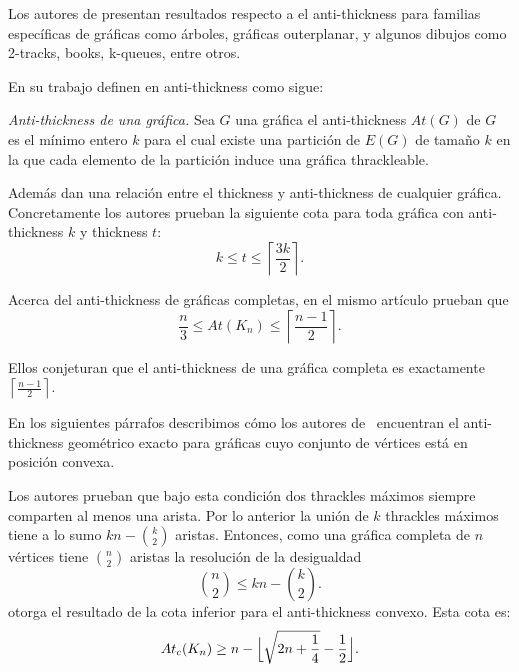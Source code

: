 %
Los autores de \cite{Dujmovic2017} presentan resultados respecto a el
anti-thickness para familias específicas de gráficas como árboles, gráficas
outerplanar, y algunos dibujos como 2-tracks, books, k-queues, entre otros.

En su trabajo definen en anti-thickness como sigue:
\begin{definition}{\emph{Anti-thickness de una gráfica.}}
Sea $G$ una gráfica el anti-thickness $At(G)$ de $G$ es el mínimo entero $k$
para el cual existe una partición de $E(G)$ de tamaño $k$
en la que cada elemento de la partición induce una gráfica thrackleable.
\end{definition}

Además dan una relación entre el thickness y anti-thickness de cualquier
gráfica. Concretamente los autores prueban la siguiente cota para toda gráfica
con anti-thickness $k$ y thickness $t$:
\[ k \leq t \leq \left\lceil \frac{3k}{2}\right\rceil .\]

Acerca del anti-thickness de gráficas completas, en el mismo artículo
prueban que \[ \frac{n}{3} \leq  At(K_n) \leq \left\lceil \frac{n-1}{2} \right\rceil . \]

Ellos conjeturan que el anti-thickness de una gráfica completa es
exactamente $\left\lceil \frac{n-1}{2} \right\rceil$.

En los siguientes párrafos describimos cómo los autores de~\cite{Fabila-Monroy2018}
encuentran el anti-thickness geométrico exacto para gráficas cuyo conjunto
de vértices está en posición convexa.

Los autores prueban que bajo esta condición dos thrackles máximos siempre
comparten al menos una arista. Por lo anterior la unión de $k$ thrackles máximos tiene
a lo sumo $kn - \binom{k}{2}$ aristas. Entonces, como una gráfica completa de $n$
vértices tiene $\binom{n}{2}$ aristas la resolución de la desigualdad
\[ \binom{n}{2} \leq kn - \binom{k}{2} .\]
otorga el resultado de la cota inferior para el anti-thickness convexo. Esta cota es:
\[ At_c(K_n) \geq n - \Bigl\lfloor \sqrt{2n + \frac{1}{4}} - \frac{1}{2} \Bigr\rfloor. \]

